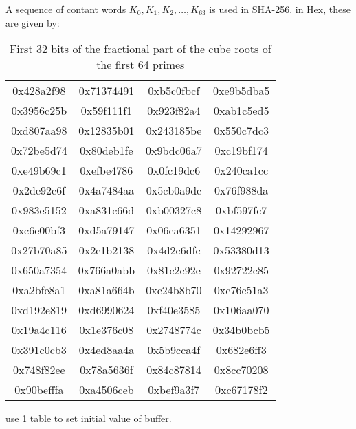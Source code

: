 \documentclass{report}
\begin{document}
A sequence of contant words $K_{0}, K_{1}, K_{2}, \ldots, K_{63}$ is used in SHA-256. in Hex, these are given by: 
\begin{table}[h!]
	\centering
	\begin{tabular}{|| c  c  c  c ||}
		\hline\hline
		0x428a2f98 & 0x71374491 & 0xb5c0fbcf & 0xe9b5dba5 \\
		0x3956c25b & 0x59f111f1 & 0x923f82a4 & 0xab1c5ed5 \\
		0xd807aa98 & 0x12835b01 & 0x243185be & 0x550c7dc3 \\
		0x72be5d74 & 0x80deb1fe & 0x9bdc06a7 & 0xc19bf174 \\
		0xe49b69c1 & 0xefbe4786 & 0x0fc19dc6 & 0x240ca1cc \\
		0x2de92c6f & 0x4a7484aa & 0x5cb0a9dc & 0x76f988da \\
		0x983e5152 & 0xa831c66d & 0xb00327c8 & 0xbf597fc7 \\
		0xc6e00bf3 & 0xd5a79147 & 0x06ca6351 & 0x14292967 \\
		0x27b70a85 & 0x2e1b2138 & 0x4d2c6dfc & 0x53380d13 \\
		0x650a7354 & 0x766a0abb & 0x81c2c92e & 0x92722c85 \\
		0xa2bfe8a1 & 0xa81a664b & 0xc24b8b70 & 0xc76c51a3 \\
		0xd192e819 & 0xd6990624 & 0xf40e3585 & 0x106aa070 \\
		0x19a4c116 & 0x1e376c08 & 0x2748774c & 0x34b0bcb5 \\
		0x391c0cb3 & 0x4ed8aa4a & 0x5b9cca4f & 0x682e6ff3 \\
		0x748f82ee & 0x78a5636f & 0x84c87814 & 0x8cc70208 \\
		0x90befffa & 0xa4506ceb & 0xbef9a3f7 & 0xc67178f2 \\
		\hline\hline
	\end{tabular}
	\caption{First 32 bits of the fractional part of the cube roots of the first 64 primes}
	\label{contant-words}
\end{table}

use \ref{contant-words} table to set initial value of buffer.
	
\appendix
\end{document}
